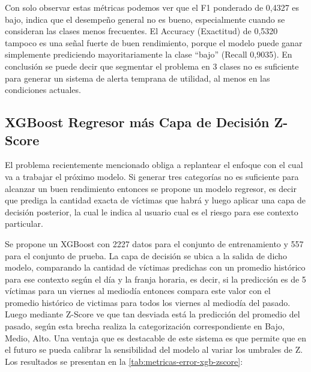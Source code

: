 
Con solo observar estas métricas podemos ver que el F1 ponderado de 0,4327 es bajo, indica que el desempeño general no es bueno, especialmente cuando se consideran las clases menos frecuentes. El Accuracy (Exactitud) de 0,5320 tampoco es una señal fuerte de buen rendimiento, porque el modelo puede ganar simplemente prediciendo mayoritariamente la clase ``bajo'' (Recall 0,9035). En conclusión se puede decir que segmentar el problema en 3 clases no es suficiente para generar un sistema de alerta temprana de utilidad, al menos en las condiciones actuales.

\subsection{XGBoost Regresor más Capa de Decisión Z-Score}\label{xgboost-regresor-muxe1s-capa-de-decisiuxf3n-z-score}

El problema recientemente mencionado obliga a replantear el enfoque con el cual va a trabajar el próximo modelo. Si generar tres categorías no es suficiente para alcanzar un buen rendimiento entonces se propone un modelo regresor, es decir que prediga la cantidad exacta de víctimas que habrá y luego aplicar una capa de decisión posterior, la cual le indica al usuario cual es el riesgo para ese contexto particular.

Se propone un XGBoost con 2227 datos para el conjunto de entrenamiento y 557 para el conjunto de prueba. La capa de decisión se ubica a la salida de dicho modelo, comparando la cantidad de víctimas predichas con un promedio histórico para ese contexto según el día y la franja horaria, es decir, si la predicción es de 5 víctimas para un viernes al mediodía entonces compara este valor con el promedio histórico de victimas para todos los viernes al mediodía del pasado. Luego mediante Z-Score ve que tan desviada está la predicción del promedio del pasado, según esta brecha realiza la categorización correspondiente en Bajo, Medio, Alto. Una ventaja que es destacable de este sistema es que permite que en el futuro se pueda calibrar la sensibilidad del modelo al variar los umbrales de Z. Los resultados se presentan en la \cref{tab:metricas-error-xgb-zscore}:

